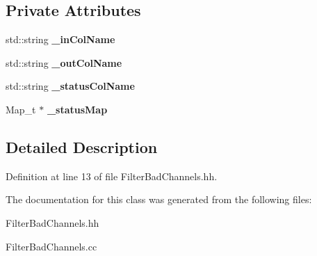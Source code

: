 \subsection*{Private Attributes}
\begin{DoxyCompactItemize}
\item 
std\-::string {\bfseries \-\_\-in\-Col\-Name}\label{classCALICE_1_1FilterBadChannels_a7febc615df3c8f9df80b96a3a23e629d}

\item 
std\-::string {\bfseries \-\_\-out\-Col\-Name}\label{classCALICE_1_1FilterBadChannels_af44ac7aeffb09195d2dc225ce3ce903b}

\item 
std\-::string {\bfseries \-\_\-status\-Col\-Name}\label{classCALICE_1_1FilterBadChannels_a011f53f4dda0d7dbc98bf73579d05c95}

\item 
Map\-\_\-t $\ast$ {\bfseries \-\_\-status\-Map}\label{classCALICE_1_1FilterBadChannels_aa6be96b02055f381369ec71ab5d989fd}

\end{DoxyCompactItemize}


\subsection{Detailed Description}


Definition at line 13 of file Filter\-Bad\-Channels.\-hh.



The documentation for this class was generated from the following files\-:\begin{DoxyCompactItemize}
\item 
Filter\-Bad\-Channels.\-hh\item 
Filter\-Bad\-Channels.\-cc\end{DoxyCompactItemize}
